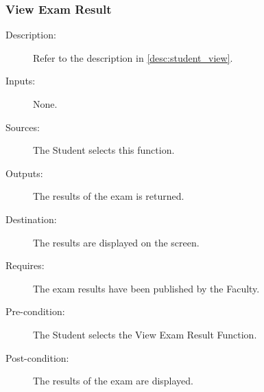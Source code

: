 \subsubsection{\large View Exam Result} 
\begin{boxed} %
\begin{description}
\item[Description:]
   Refer to the description in \autoref{desc:student_view}.
\item[Inputs:]
   None.
\item[Sources:]
   The Student selects this function.
\item[Outputs:]
   The results of the exam is returned.
\item[Destination:]
   The results are displayed on the screen.
\item[Requires:]
   The exam results have been published by the Faculty.
\item[Pre-condition:]
   The Student selects the View Exam Result Function.
\item[Post-condition:]
   The results of the exam are displayed.
\end{description}
\end{boxed} %
